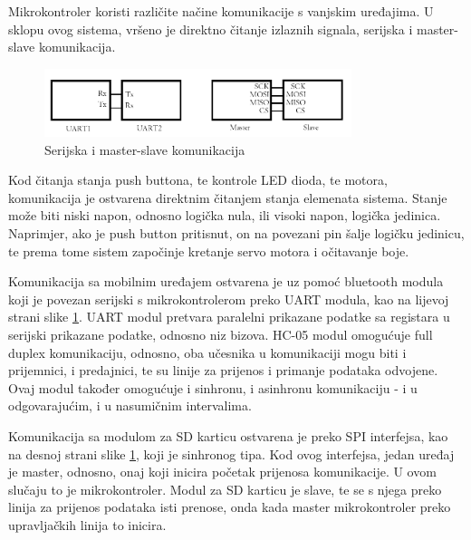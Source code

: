 Mikrokontroler koristi različite načine komunikacije s vanjskim uređajima. U sklopu ovog sistema, vršeno je direktno čitanje izlaznih signala, serijska i master-slave komunikacija.

\begin{figure}[h!]
  \centering
  \includegraphics[width=0.8\textwidth]{komunikacija}
  \caption{Serijska i master-slave komunikacija}
  \label{fig:Slika_Komunikacija}
\end{figure}

Kod čitanja stanja push buttona, te kontrole LED dioda, te motora, komunikacija je ostvarena direktnim čitanjem stanja elemenata sistema. Stanje može biti niski napon, odnosno logička nula, ili visoki napon, logička jedinica. Naprimjer, ako je push button pritisnut, on na povezani pin šalje logičku jedinicu, te prema tome sistem započinje kretanje servo motora i očitavanje boje. 

Komunikacija sa mobilnim uređajem ostvarena je uz pomoć bluetooth modula koji je povezan serijski s mikrokontrolerom preko UART modula, kao na lijevoj strani slike \ref{fig:Slika_Komunikacija}. UART modul pretvara paralelni prikazane podatke sa registara u serijski prikazane podatke, odnosno niz bizova. HC-05 modul omogućuje full duplex komunikaciju, odnosno, oba učesnika u komunikaciji mogu biti i prijemnici, i predajnici, te su linije za prijenos i primanje podataka odvojene. Ovaj modul također omogućuje i sinhronu, i asinhronu komunikaciju - i u odgovarajućim, i u nasumičnim intervalima. 

Komunikacija sa modulom za SD karticu ostvarena je preko SPI interfejsa, kao na desnoj strani slike \ref{fig:Slika_Komunikacija}, koji je sinhronog tipa. Kod ovog interfejsa, jedan uređaj je master, odnosno, onaj koji inicira početak prijenosa komunikacije. U ovom slučaju to je mikrokontroler. Modul za SD karticu je slave, te se s njega preko linija za prijenos podataka isti prenose, onda kada master mikrokontroler preko upravljačkih linija to inicira.